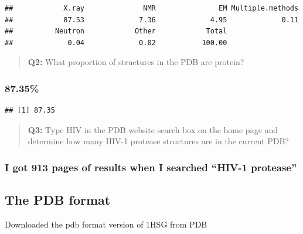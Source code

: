 \documentclass[
]{article}
\newenvironment{Shaded}{\begin{snugshade}}{\end{snugshade}}
\newcommand{\DecValTok}[1]{\textcolor[rgb]{0.00,0.00,0.81}{#1}}
\newcommand{\FunctionTok}[1]{\textcolor[rgb]{0.00,0.00,0.00}{#1}}
\newcommand{\NormalTok}[1]{#1}
\newcommand{\SpecialCharTok}[1]{\textcolor[rgb]{0.00,0.00,0.00}{#1}}
\begin{document}
\begin{verbatim}
##            X.ray              NMR               EM Multiple.methods 
##            87.53             7.36             4.95             0.11 
##          Neutron            Other            Total 
##             0.04             0.02           100.00
\end{verbatim}

\begin{quote}
\textbf{Q2:} What proportion of structures in the PDB are protein?
\end{quote}

\hypertarget{section}{%
\subsubsection{87.35\%}\label{section}}

\begin{Shaded}
\end{Shaded}

\begin{verbatim}
## [1] 87.35
\end{verbatim}

\begin{quote}
\textbf{Q3:} Type HIV in the PDB website search box on the home page and
determine how many HIV-1 protease structures are in the current PDB?
\end{quote}

\hypertarget{i-got-913-pages-of-results-when-i-searched-hiv-1-protease}{%
\subsubsection{I got 913 pages of results when I searched ``HIV-1
protease''}\label{i-got-913-pages-of-results-when-i-searched-hiv-1-protease}}

\hypertarget{the-pdb-format}{%
\subsection{The PDB format}\label{the-pdb-format}}

Downloaded the pdb format version of 1HSG from PDB
\end{document}
